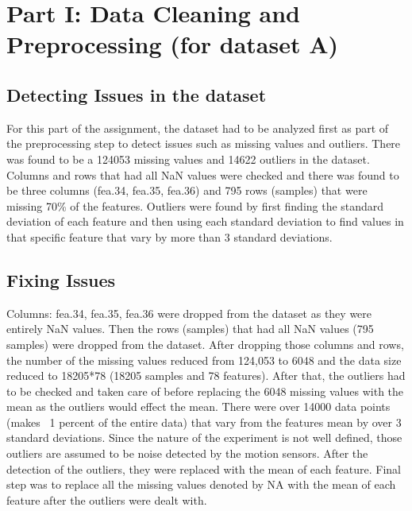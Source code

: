 \section{Part I: Data Cleaning and Preprocessing (for dataset A)}
\subsection{Detecting Issues in the dataset}
For this part of the assignment, the dataset had to be analyzed first as part of the preprocessing step to detect issues such as missing values and outliers. There was found to be a 124053 missing values and 14622 outliers in the dataset. Columns and rows that had all NaN values were checked and there was found to be three columns (fea.34, fea.35, fea.36) and 795 rows (samples) that were missing 70\% of the features.
Outliers were found by first finding the standard deviation of each feature and then using each standard deviation to find values in that specific feature that vary by more than 3 standard deviations. 

\subsection{Fixing Issues}
Columns: fea.34, fea.35, fea.36 were dropped from the dataset as they were entirely NaN values. Then the rows (samples) that had all NaN values (795 samples) were dropped from the dataset. After dropping those columns and rows, the number of the missing values reduced from 124,053 to 6048 and the data size reduced to 18205*78 (18205 samples and 78 features). 
After that, the outliers had to be checked and taken care of before replacing the 6048 missing values with the mean as the outliers would effect the mean. There were over 14000 data points (makes ~1 percent of the entire data) that vary from the features mean by over 3 standard deviations. Since the nature of the experiment is not well defined, those outliers are assumed to be noise detected by the motion sensors. After the detection of the outliers, they were replaced with the mean of each feature. Final step was to replace all the missing values denoted by NA with the mean of each feature after the outliers were dealt with. 

